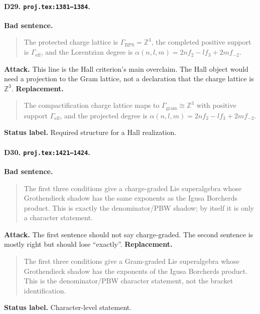 \paragraph{D29. \texttt{proj.tex:1381--1384}.}
\textbf{Bad sentence.}
\begin{quote}\small
The protected charge lattice is
\(\Gamma_{\mathrm{BPS}}=\mathbb Z^3\), the completed positive support is
\(\Gamma_{\mathrm{eff}}\), and the Lorentzian degree is
\(\alpha(n,l,m)=2nf_2-lf_3+2mf_{-2}\).
\end{quote}
\textbf{Attack.}
This line is the Hall criterion's main overclaim.  The Hall object would
need a projection to the Gram lattice, not a declaration that the charge
lattice is \(\mathbb Z^3\).
\textbf{Replacement.}
\begin{quote}\small
The compactification charge lattice maps to
\(\Gamma_{\mathrm{gram}}\cong\mathbb Z^3\) with positive support
\(\Gamma_{\mathrm{eff}}\), and the projected degree is
\(\alpha(n,l,m)=2nf_2-lf_3+2mf_{-2}\).
\end{quote}
\textbf{Status label.} Required structure for a Hall realization.

\paragraph{D30. \texttt{proj.tex:1421--1424}.}
\textbf{Bad sentence.}
\begin{quote}\small
The first three conditions give a charge-graded Lie superalgebra whose
Grothendieck shadow has the same exponents as the Igusa Borcherds
product.  This is exactly the denominator/PBW shadow; by itself it is
only a character statement.
\end{quote}
\textbf{Attack.}
The first sentence should not say charge-graded.  The second sentence is
mostly right but should lose ``exactly''.
\textbf{Replacement.}
\begin{quote}\small
The first three conditions give a Gram-graded Lie superalgebra whose
Grothendieck shadow has the exponents of the Igusa Borcherds product.
This is the denominator/PBW character statement, not the bracket
identification.
\end{quote}
\textbf{Status label.} Character-level statement.

